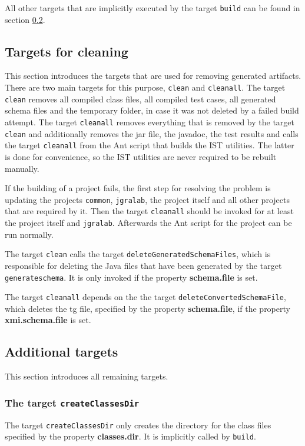 \documentclass[a4paper,twoside,11pt,bibtotoc]{article}
\begin{document}
All other targets that are implicitly executed by the target \texttt{build} can be found in section \ref{sec:additional}.

\subsection{Targets for cleaning}
\label{sec:cleaning}
This section introduces the targets that are used for removing generated artifacts.
There are two main targets for this purpose, \texttt{clean} and \texttt{cleanall}.
The target \texttt{clean} removes all compiled class files, all compiled test cases, all generated schema files and the temporary folder, in case it was not deleted by a failed build attempt.
The target \texttt{cleanall} removes everything that is removed by the target \texttt{clean} and additionally removes the jar file, the javadoc, the test results and calls the target \texttt{cleanall} from the Ant script that builds the IST utilities.
The latter is done for convenience, so the IST utilities are never required to be rebuilt manually.

If the building of a project fails, the first step for resolving the problem is updating the projects \texttt{common}, \texttt{jgralab}, the project itself and all other projects that are required by it.
Then the target \texttt{cleanall} should be invoked for at least the project itself and \texttt{jgralab}.
Afterwards the Ant script for the project can be run normally.

The target \texttt{clean} calls the target \texttt{deleteGeneratedSchemaFiles}, which is responsible for deleting the Java files that have been generated by the target \texttt{generateschema}.
It is only invoked if the property \textbf{schema.file} is set.

The target \texttt{cleanall} depends on the the target \texttt{deleteConvertedSchemaFile}, which deletes the tg file, specified by the property \textbf{schema.file}, if the property \textbf{xmi.schema.file} is set.


\subsection{Additional targets}
\label{sec:additional}
This section introduces all remaining targets.

\subsubsection{The target \texttt{createClassesDir}}
The target \texttt{createClassesDir} only creates the directory for the class files specified by the property \textbf{classes.dir}.
It is implicitly called by \texttt{build}.
\end{document}
